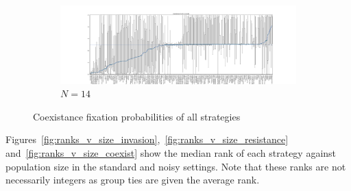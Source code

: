 \documentclass{article}
\begin{document}
\begin{figure}[!hbtp]
    \begin{subfigure}[t]{\textwidth}
        \centering
        \includegraphics[width=\textwidth]{../img/coexistance_boxplot_14_std.pdf}
        \caption{\(N=14\)}
    \end{subfigure}%
    \caption{Coexistance fixation probabilities of all strategies}
    \label{fig:coexistance_boxplot_std}
\end{figure}


Figures~\ref{fig:ranks_v_size_invasion},~\ref{fig:ranks_v_size_resistance}
and~\ref{fig:ranks_v_size_coexist} show the median rank of each strategy against
population size in the standard and noisy settings. Note that these ranks are
not necessarily integers as group ties are given the average rank.
\end{document}
